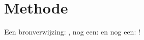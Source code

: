 \chapter{Methode}
Een bronverwijzing: \parencite{Orwell1994}, nog een: \parencite{Collins2010} en
nog een: \parencite{Adams1979}!

